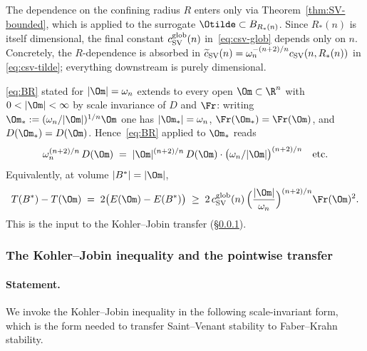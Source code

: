 \begin{remark}[Dependence on $R$]\label{rem:R-dropout}
The dependence on the confining radius $R$ enters only via
Theorem~\ref{thm:SV-bounded}, which is applied to the surrogate
$\Otilde\subset B_{R_*(n)}$. Since $R_*(n)$ is itself dimensional, the
final constant $c_{\rm SV}^{\rm glob}(n)$ in~\eqref{eq:csv-glob}
depends only on $n$. Concretely, the
$R$-dependence is absorbed in
$\widetilde c_{\rm SV}(n)=\omega_n^{-(n+2)/n}c_{\rm SV}(n,R_*(n))$ in
\eqref{eq:csv-tilde}; everything downstream is purely dimensional.
\end{remark}

\begin{remark}\label{rem:scale-removal}
\eqref{eq:BR} stated for $|\Om|=\omega_n$ extends to every open
$\Om\subset\R^n$ with $0<|\Om|<\infty$ by scale invariance of $D$ and
$\Fr$: writing
$\Om_*:=(\omega_n/|\Om|)^{1/n}\Om$ one has $|\Om_*|=\omega_n$,
$\Fr(\Om_*)=\Fr(\Om)$, and $D(\Om_*)=D(\Om)$. Hence~\eqref{eq:BR}
applied to $\Om_*$ reads
\begin{equation}\label{eq:BR-scaleinv}
\omega_n^{(n+2)/n}\,D(\Om) \;=\; |\Om|^{(n+2)/n}\,D(\Om)\cdot
\bigl(\omega_n/|\Om|\bigr)^{(n+2)/n}
\quad\text{etc.}
\end{equation}
Equivalently, at volume $|B^*|=|\Om|$,
\begin{equation}\label{eq:torsion-deficit-out}
T(B^*) - T(\Om)
\;=\; 2\bigl(E(\Om)-E(B^*)\bigr)
\;\ge\; 2\,c_{\rm SV}^{\rm glob}(n)\,
\Bigl(\frac{|\Om|}{\omega_n}\Bigr)^{(n+2)/n}\Fr(\Om)^2.
\end{equation}
This is the input to the Kohler--Jobin transfer
(\S\ref{ssec:kj-inequality}).
\end{remark}

\subsubsection{The Kohler--Jobin inequality and the pointwise transfer}
\label{ssec:kj-inequality}

\paragraph{Statement.} We invoke the Kohler--Jobin inequality in the
following scale-invariant form, which is the form needed to transfer
Saint--Venant stability to Faber--Krahn stability.

